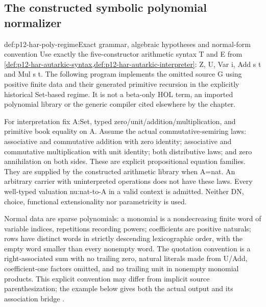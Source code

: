 \subsection{The constructed symbolic polynomial normalizer}

\begin{hbdefinition}{def:p12-har-poly-regime}{Exact grammar, algebraic hypotheses and normal-form convention}
Use exactly the five-constructor arithmetic syntax T and E from
\cref{def:p12-har-autarkic-syntax,def:p12-har-autarkic-interpreter}:
Z, U, Var i, Add s t and Mul s t. The following program implements
the omitted source G using positive finite data and their generated
primitive recursion in the explicitly historical Set-based regime.
It is not a beta-only HOL term, an imported polynomial library or the
generic compiler cited elsewhere by the chapter.

For interpretation fix A:Set, typed zero/unit/addition/multiplication,
and primitive book equality on A. Assume the actual commutative-semiring
laws: associative and commutative addition with zero identity;
associative and commutative multiplication with unit identity;
both distributive laws; and zero annihilation on both sides.
These are explicit propositional equation families. They are supplied
by the constructed arithmetic library when A=nat. An arbitrary carrier
with uninterpreted operations does not have these laws.
Every well-typed valuation nu:nat-to-A in a valid context is admitted.
Neither DN, choice, functional extensionality nor parametricity is used.

Normal data are sparse polynomials: a monomial is a nondecreasing finite
word of variable indices, repetitions recording powers; coefficients
are positive naturals; rows have distinct words in strictly descending
lexicographic order, with the empty word smaller than every nonempty
word. The quotation convention is a right-associated sum with no
trailing zero, natural literals made from U/Add, coefficient-one factors
omitted, and no trailing unit in nonempty monomial products. This
explicit convention may differ from implicit source parenthesization;
the example below gives both the actual output and its association bridge
\cite[pp.~1221--1222]{BarendregtGeuvers2001}.
\end{hbdefinition}

